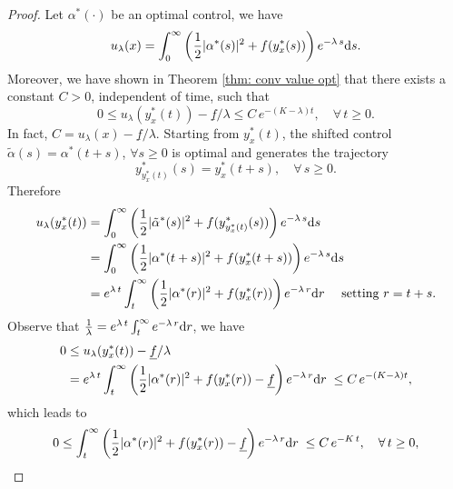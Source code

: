 \documentclass[12pt]{amsart}
\newcommand{\D}[1]{\mbox{\rm #1}}
\newcommand{\dd}{\D{d}}
\numberwithin{equation}{section}
\theoremstyle{plain}
\begin{document}
\begin{proof}
Let $\alpha^*(\cdot)$ be an optimal control, we have 
\begin{equation*}
    u_{\lambda}(x) = \int_{0}^{\infty} \left(\frac{1}{2}|\alpha^{*}(s)|^{2} + f(y_{x}^{*}(s))\right) e^{-\lambda \, s }\dd s.
\end{equation*}
Moreover, we have shown in Theorem \ref{thm: conv value opt} that there exists a constant $C>0$, independent of time, such that 
\begin{equation*}
    0\leq u_{\lambda}(y_{x}^{*}(t)) - \underline{f}/\lambda \leq C\, e^{-(K-\lambda)t}, \quad \forall\, t\geq 0.
\end{equation*}
In fact, $C=u_{\lambda}(x)-\underline{f}/\lambda$.
Starting from $y_{x}^{*}(t)$, the shifted control $\tilde{\alpha}(s) = \alpha^{*}(t+s)$, $\forall s\geq 0$ is optimal and generates the trajectory
\begin{equation*}
    y^{*}_{y^{*}_{x}(t)}(s) = y^{*}_{x}(t+s), \quad \forall\,s\geq 0.
\end{equation*}
Therefore
\begin{equation*}
\begin{aligned}
    u_{\lambda}(y^{*}_{x}(t))
    & = \int_{0}^{\infty} \left(\frac{1}{2}|\tilde{\alpha}^{*}(s)|^{2} + f(y_{y_{x}^{*}(t)}^{*}(s))\right) e^{-\lambda \, s }\dd s\\
    & = \int_{0}^{\infty} \left(\frac{1}{2}|\alpha^{*}(t+s)|^{2} + f(y_{x}^{*}(t+s))\right) e^{-\lambda \, s }\dd s\\
    & = e^{\lambda\,t} \int_{t}^{\infty} \left(\frac{1}{2}|\alpha^{*}(r)|^{2} + f(y_{x}^{*}(r))\right) e^{-\lambda \, r }\dd r \quad \text{ setting } r=t+s.
\end{aligned}
\end{equation*}
Observe that $\frac{1}{\lambda} = e^{\lambda \, t} \int_{t}^{\infty} e^{-\lambda\, r}\dd r$, we have
\begin{equation*}
\begin{aligned}
    0 & \leq u_{\lambda}(y_{x}^{*}(t)) - \underline{f}/\lambda\\
    & = e^{\lambda\,t} \int_{t}^{\infty} \left(\frac{1}{2}|\alpha^{*}(r)|^{2} + f(y_{x}^{*}(r)) - \underline{f}\right) e^{-\lambda \, r }\dd r \; \leq C\, e^{-(K-\lambda)t},
\end{aligned}
\end{equation*}
which leads to 
\begin{equation}\label{L1}
    0\leq \int_{t}^{\infty} \left(\frac{1}{2}|\alpha^{*}(r)|^{2} + f(y_{x}^{*}(r)) - \underline{f}\right) e^{-\lambda \, r }\dd r \; \leq C\, e^{-K\,t}, \quad \forall\,t\geq 0,

\end{equation}
\end{proof}
\end{document}
